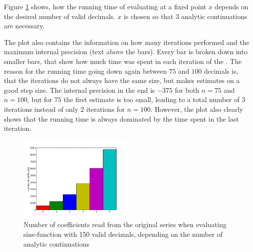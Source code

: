 		Figure \ref{fig:sin dep on n} shows, how the running time of evaluating at a fixed point $x$ depends on the desired number of valid decimals. 
		$x$ is chosen so that $3$ analytic continuations are necessary. 

		The plot also contains the information on how many iterations \irram performed and the maximum internal 
		precision (text above the bars). 
		Every bar is broken down into smaller bars, that show how much time was spent in each iteration of the \irram.
		The reason for the running time going down again between $75$ and $100$ decimals is, that
		the iterations do not always have the same size, but \irram makes estimates on a good step size.
		The internal precision in the end is $-375$ for both $n=75$ and $n=100$, but 
		for $75$ the first estimate is too small, leading to a total number of $3$ iterations instead of only $2$ iterations for $n=100$.
		However, the plot also clearly shows that the running time is always dominated by the time spent in the last iteration.

		\begin{figure}[h]
			\centering
			\includegraphics[width=0.5\textwidth]{img/analytic/sin_for_coeffs_prec_150_dep_on_series.png}
			\caption{Number of coefficients read from the original series when evaluating sine-function with 150 valid decimals, depending on the number of analytic continuations}
			\label{fig:sin dep on n}
		\end{figure}


